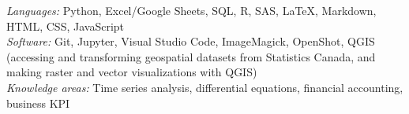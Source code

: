 \documentclass[margin, 10pt]{res} %
\begin{document}
\begin{resume}
{\sl Languages:} 
Python, Excel/Google Sheets, SQL, R, SAS, \LaTeX{}, Markdown, HTML, CSS, JavaScript \\

{\sl Software:}
Git, Jupyter, Visual Studio Code, ImageMagick, OpenShot, QGIS (accessing and transforming geospatial datasets from Statistics Canada, and making raster and vector visualizations with QGIS)\\

{\sl Knowledge areas:}
Time series analysis, differential equations, financial accounting, business KPI

\end{resume}
\end{document}
